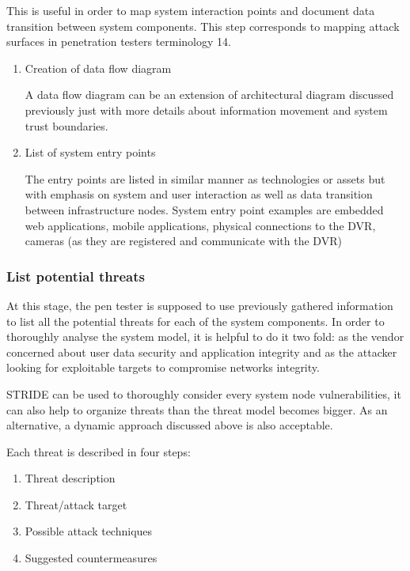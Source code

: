 	This is useful in order to map system interaction points and document data transition between system components. This step corresponds to mapping attack surfaces in penetration testers terminology {14}.
	
	\begin{enumerate}
		\item Creation of data flow diagram
		
		A data flow diagram can be an extension of architectural diagram discussed previously just with more details about information movement and system trust boundaries.
		
		\item List of system entry points
		
		The entry points are listed in similar manner as technologies or assets but with emphasis on system and user interaction as well as data transition between infrastructure nodes.
		\newline
		System entry point examples are embedded web applications, mobile applications, physical connections to the DVR, cameras (as they are registered and communicate with the DVR)
	\end{enumerate}
	
	\subsubsection{List potential threats}
	
	At this stage, the pen tester is supposed to use previously gathered information to list all the potential threats for each of the system components. In order to thoroughly analyse the system model, it is helpful to do it two fold: as the vendor concerned about user data security and application integrity and as the attacker looking for exploitable targets to compromise networks integrity.
	
	STRIDE can be used to thoroughly consider every system node vulnerabilities, it can also help to organize threats than the threat model becomes bigger. As an alternative, a dynamic approach discussed above is also acceptable.
	
	Each threat is described in four steps:
	\begin{enumerate}
		\item Threat description
		\item Threat/attack target
		\item Possible attack techniques
		\item Suggested countermeasures
	\end{enumerate}

